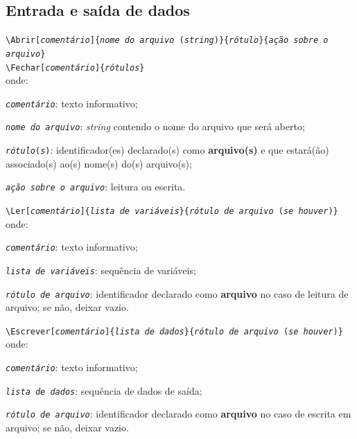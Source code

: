 \documentclass[a4paper,12pt,oneside,onecolumn,final,fleqn]{repUERJ}
\begin{document}
\subsection{Entrada e saída de dados}

\begin{alinea}
\item \texttt{\textbackslash Abrir[\textit{comentário}]\{\textit{nome do arquivo }(\textit{string})\}\{\textit{rótulo}\}\{\textit{ação sobre o arquivo}\}}\\
      \texttt{\textbackslash Fechar[\textit{comentário}]\{\textit{rótulos}\}}\\
      onde:
      \begin{alinea}
          \item \textit{\texttt{comentário}}: texto informativo;
          \item \texttt{\textit{nome do arquivo}}: \textit{string}
                contendo o nome do arquivo que será aberto;
          \item \texttt{\textit{rótulo}(\textit{s})}: 
                identificador(es) declarado(s) como
                \textbf{arquivo(s)} e que estará(ão) 
                associado(s) ao(s) nome(s) do(s) arquivo(s);
          \item \texttt{\textit{ação sobre o arquivo}}: leitura
                ou escrita.
      \end{alinea}
\item \texttt{\textbackslash Ler[\textit{comentário}]\{\textit{lista de variáveis}\}\{\textit{rótulo de arquivo} (\textit{se houver})\}}\\
      onde:
      \begin{alinea}
          \item \textit{\texttt{comentário}}: texto informativo;
          \item \texttt{\textit{lista de variáveis}}: sequência
                de variáveis;
          \item \texttt{\textit{rótulo de arquivo}}:
                identificador declarado como \textbf{arquivo}
                no caso de leitura de arquivo; se não, deixar
                vazio.
      \end{alinea}
\item \texttt{\textbackslash Escrever[\textit{comentário}]\{\textit{lista de dados}\}\{\textit{rótulo de arquivo} (\textit{se houver})\}}\\
      onde:
      \begin{alinea}
          \item \textit{\texttt{comentário}}: texto informativo;
          \item \texttt{\textit{lista de dados}}: sequência de 
                dados de saída;
          \item \texttt{\textit{rótulo de arquivo}}:
                identificador declarado como \textbf{arquivo} 
                no caso de escrita em arquivo; se não, deixar
                vazio.\\
      \end{alinea}
\end{alinea}
\end{document}
